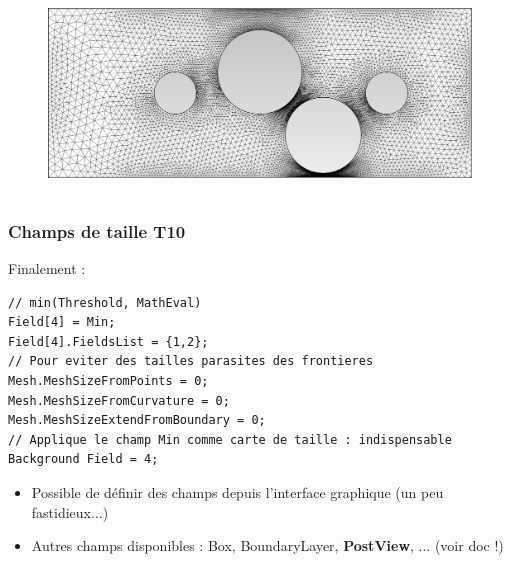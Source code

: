 \documentclass[aspectratio=169]{beamer}
\begin{document}
\begin{frame}[fragile]
\begin{columns}
\begin{column}{0.4\textwidth}
    \vspace{-2.3cm}
    \begin{figure}
      \includegraphics[width=1.02\textwidth]{figures/automatic.png}
      \caption{}
    \end{figure}
  \end{column}
\end{columns}
\end{frame}

\begin{frame}[fragile]
\frametitle{Champs de taille \hfill T10}
Finalement :
\begin{lstlisting}[belowskip=0.5mm]
// min(Threshold, MathEval)
Field[4] = Min;
Field[4].FieldsList = {1,2};
// Pour eviter des tailles parasites des frontieres
Mesh.MeshSizeFromPoints = 0;
Mesh.MeshSizeFromCurvature = 0;
Mesh.MeshSizeExtendFromBoundary = 0;
// Applique le champ Min comme carte de taille : indispensable
Background Field = 4;
\end{lstlisting}
\begin{itemize}
  \item Possible de définir des champs depuis l'interface graphique (un peu fastidieux...)
  \item Autres champs disponibles : Box, BoundaryLayer, \textbf{PostView}, ... (voir doc !)
\end{itemize}
\end{frame}
\end{document}
